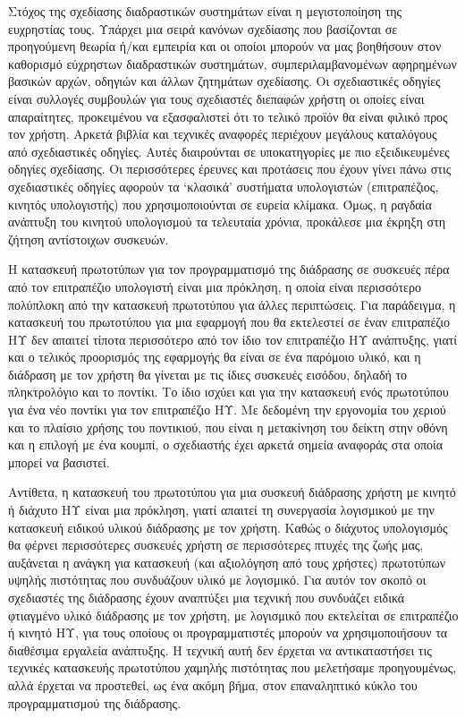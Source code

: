 \documentclass[
]{article}
\begin{document}
Στόχος της σχεδίασης διαδραστικών συστημάτων είναι η μεγιστοποίηση της
ευχρηστίας τους. Υπάρχει μια σειρά κανόνων σχεδίασης που βασίζονται σε
προηγούμενη θεωρία ή/και εμπειρία και οι οποίοι μπορούν να μας βοηθήσουν
στον καθορισμό εύχρηστων διαδραστικών συστημάτων, συμπεριλαμβανομένων
αφηρημένων βασικών αρχών, οδηγιών και άλλων ζητημάτων σχεδίασης. Οι
σχεδιαστικές οδηγίες είναι συλλογές συμβουλών για τους σχεδιαστές
διεπαφών χρήστη οι οποίες είναι απαραίτητες, προκειμένου να εξασφαλιστεί
ότι το τελικό προϊόν θα είναι φιλικό προς τον χρήστη. Αρκετά βιβλία και
τεχνικές αναφορές περιέχουν μεγάλους καταλόγους από σχεδιαστικές
οδηγίες. Αυτές διαιρούνται σε υποκατηγορίες με πιο εξειδικευμένες
οδηγίες σχεδίασης. Οι περισσότερες έρευνες και προτάσεις που έχουν γίνει
πάνω στις σχεδιαστικές οδηγίες αφορούν τα `κλασικά' συστήματα
υπολογιστών (επιτραπέζιος, κινητός υπολογιστής) που χρησιμοποιούνται σε
ευρεία κλίμακα. Όμως, η ραγδαία ανάπτυξη του κινητού υπολογισμού τα
τελευταία χρόνια, προκάλεσε μια έκρηξη στη ζήτηση αντίστοιχων συσκευών.

Η κατασκευή πρωτοτύπων για τον προγραμματισμό της διάδρασης σε συσκευές
πέρα από τον επιτραπέζιο υπολογιστή είναι μια πρόκληση, η οποία είναι
περισσότερο πολύπλοκη από την κατασκευή πρωτοτύπου για άλλες
περιπτώσεις. Για παράδειγμα, η κατασκευή του πρωτοτύπου για μια εφαρμογή
που θα εκτελεστεί σε έναν επιτραπέζιο ΗΥ δεν απαιτεί τίποτα περισσότερο
από τον ίδιο τον επιτραπέζιο ΗΥ ανάπτυξης, γιατί και ο τελικός
προορισμός της εφαρμογής θα είναι σε ένα παρόμοιο υλικό, και η διάδραση
με τον χρήστη θα γίνεται με τις ίδιες συσκευές εισόδου, δηλαδή το
πληκτρολόγιο και το ποντίκι. Το ίδιο ισχύει και για την κατασκευή ενός
πρωτοτύπου για ένα νέο ποντίκι για τον επιτραπέζιο ΗΥ. Με δεδομένη την
εργονομία του χεριού και το πλαίσιο χρήσης του ποντικιού, που είναι η
μετακίνηση του δείκτη στην οθόνη και η επιλογή με ένα κουμπί, ο
σχεδιαστής έχει αρκετά σημεία αναφοράς στα οποία μπορεί να βασιστεί.

Αντίθετα, η κατασκευή του πρωτοτύπου για μια συσκευή διάδρασης χρήστη με
κινητό ή διάχυτο ΗΥ είναι μια πρόκληση, γιατί απαιτεί τη συνεργασία
λογισμικού με την κατασκευή ειδικού υλικού διάδρασης με τον χρήστη.
Καθώς ο διάχυτος υπολογισμός θα φέρνει περισσότερες συσκευές χρήστη σε
περισσότερες πτυχές της ζωής μας, αυξάνεται η ανάγκη για κατασκευή (και
αξιολόγηση από τους χρήστες) πρωτοτύπων υψηλής πιστότητας που συνδυάζουν
υλικό με λογισμικό. Για αυτόν τον σκοπό οι σχεδιαστές της διάδρασης
έχουν αναπτύξει μια τεχνική που συνδυάζει ειδικά φτιαγμένο υλικό
διάδρασης με τον χρήστη, με λογισμικό που εκτελείται σε επιτραπέζιο ή
κινητό ΗΥ, για τους οποίους οι προγραμματιστές μπορούν να
χρησιμοποιήσουν τα διαθέσιμα εργαλεία ανάπτυξης. Η τεχνική αυτή δεν
έρχεται να αντικαταστήσει τις τεχνικές κατασκευής πρωτοτύπου χαμηλής
πιστότητας που μελετήσαμε προηγουμένως, αλλά έρχεται να προστεθεί, ως
ένα ακόμη βήμα, στον επαναληπτικό κύκλο του προγραμματισμού της
διάδρασης.
\end{document}
